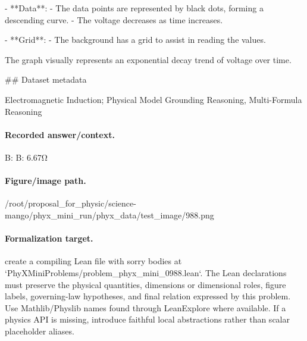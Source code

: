 - **Data**: 
  - The data points are represented by black dots, forming a descending curve.
  - The voltage decreases as time increases.

- **Grid**: 
  - The background has a grid to assist in reading the values.

The graph visually represents an exponential decay trend of voltage over time.

\#\# Dataset metadata

Electromagnetic Induction; Physical Model Grounding Reasoning, Multi-Formula Reasoning

\paragraph{Recorded answer/context.}
B: B: 6.67Ω

\paragraph{Figure/image path.}
/root/proposal\_for\_physic/science-mango/phyx\_mini\_run/phyx\_data/test\_image/988.png

\paragraph{Formalization target.}
create a compiling Lean file with sorry bodies at `PhyXMiniProblems/problem\_phyx\_mini\_0988.lean`. The Lean declarations must preserve the physical quantities, dimensions or dimensional roles, figure labels, governing-law hypotheses, and final relation expressed by this problem.
Use Mathlib/Physlib names found through LeanExplore where available. If a physics API is missing, introduce faithful local abstractions rather than scalar placeholder aliases.

